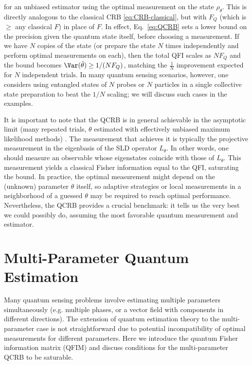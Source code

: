 for an unbiased estimator using the optimal measurement on the state $\rho_\theta$. This is directly analogous to the classical CRB \eqref{eq:CRB-classical}, but with $F_Q$ (which is $\ge$ any classical $F$) in place of $F$. In effect, Eq.~\eqref{eq:QCRB} sets a lower bound on the precision given the quantum state itself, before choosing a measurement. If we have $N$ copies of the state (or prepare the state $N$ times independently and perform optimal measurements on each), then the total QFI scales as $N F_Q$ and the bound becomes $\Var(\hat{\theta}) \ge 1/(N F_Q)$, matching the $\frac{1}{N}$ improvement expected for $N$ independent trials. In many quantum sensing scenarios, however, one considers using entangled states of $N$ probes or $N$ particles in a single collective state preparation to beat the $1/N$ scaling; we will discuss such cases in the examples.



It is important to note that the QCRB is in general achievable in the asymptotic limit (many repeated trials, $\theta$ estimated with effectively unbiased maximum likelihood methods) \cite{BraunsteinCaves1994, Helstrom1976}. The measurement that achieves it is typically the projective measurement in the eigenbasis of the SLD operator $L_\theta$. In other words, one should measure an observable whose eigenstates coincide with those of $L_\theta$. This measurement yields a classical Fisher information equal to the QFI, saturating the bound. In practice, the optimal measurement might depend on the (unknown) parameter $\theta$ itself, so adaptive strategies or local measurements in a neighborhood of a guessed $\theta$ may be required to reach optimal performance. Nevertheless, the QCRB provides a crucial benchmark: it tells us the very best we could possibly do, assuming the most favorable quantum measurement and estimator.



\section{Multi-Parameter Quantum Estimation}

\label{sec:multiparam}



Many quantum sensing problems involve estimating multiple parameters simultaneously (e.g. multiple phases, or a vector field with components in different directions). The extension of quantum estimation theory to the multi-parameter case is not straightforward due to potential incompatibility of optimal measurements for different parameters. Here we introduce the quantum Fisher information matrix (QFIM) and discuss conditions for the multi-parameter QCRB to be saturable.



